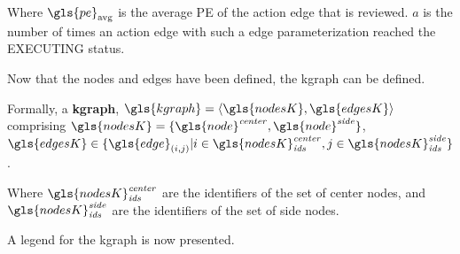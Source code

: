 Where $\gls{pe}_\textrm{avg}$ is the average \ac{PE} of the action edge that is reviewed. $a$ is the number of times an action edge with such a edge parameterization reached the EXECUTING status.\bs

\noindent Now that the nodes and edges have been defined, the \ac{kgraph} can be defined.\bs

Formally, a \textbf{\acl{kgraph}}, $\gls{kgraph} = \left\langle \gls{nodesK}, \gls{edgesK} \right\rangle $
\\comprising $\gls{nodesK} = \{\gls{node}^{\mathit{center}}, \gls{node}^{\mathit{side}}\}$, \quad $\gls{edgesK} \in \{\gls{edge}_{(i,j)}| i \in \gls{nodesK}^\mathit{center}_\mathit{ids}, j \in \gls{nodesK}^\mathit{side}_\mathit{ids} \}$.\bs

Where $\gls{nodesK}^\mathit{center}_\mathit{ids}$ are the identifiers of the set of center nodes, and $\gls{nodesK}^\mathit{side}_\mathit{ids}$ are the identifiers of the set of side nodes.\bs

A legend for the \ac{kgraph} is now presented.\bs

